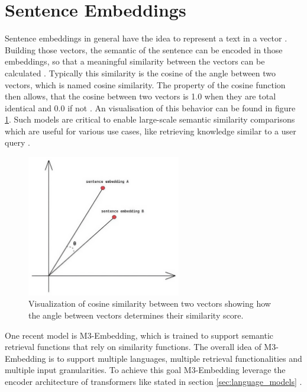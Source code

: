 \documentclass[a4paper,oneside,bibliography=totoc]{scrbook}
\begin{document}
\section{Sentence Embeddings}
\label{sec:sentence_embeddings}

Sentence embeddings in general have the idea to represent a text in a vector \cite{Singhal2001}. Building those vectors, the semantic of the sentence can be encoded in those embeddings, so that a meaningful similarity between the vectors can be calculated \cite{Reimers2019}. Typically this similarity is the cosine of the angle between two vectors, which is named cosine similarity. The property of the cosine function then allows, that the cosine between two vectors is 1.0 when they are total identical and 0.0 if not \cite{Singhal2001}. An visualisation of this behavior can be found in figure \ref{fig:cosine_similarity}. Such models are critical to enable large-scale semantic similarity comparisons which are useful for various use cases, like retrieving knowledge similar to a user query \cite{Reimers2019,Gao2024}.

\begin{figure}[t]
  \centering
  \includegraphics[width=0.6\textwidth]{figures/cosine_similarity.jpeg}
  \caption[Visualization of cosine similarity between two vectors showing how the angle between vectors determines their similarity score]{Visualization of cosine similarity between two vectors showing how the angle between vectors determines their similarity score. \cite{Leys2022}}
  \label{fig:cosine_similarity}
\end{figure}

One recent model is M3-Embedding, which is trained to support semantic retrieval functions that rely on similarity functions. The overall idea of M3-Embedding is to support multiple languages, multiple retrieval functionalities and multiple input granularities. To achieve this goal M3-Embedding leverage the encoder architecture of transformers like stated in section \ref{sec:language_models} \cite{Chen2024}.
\end{document}

